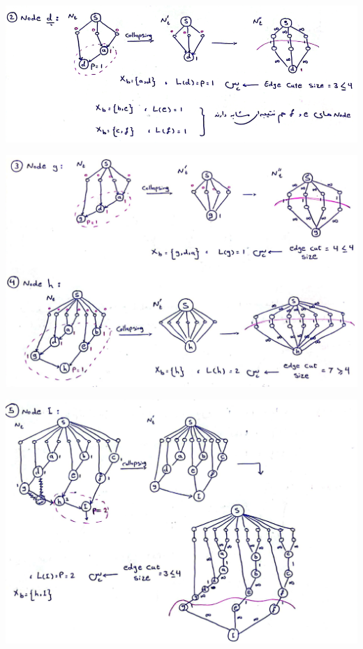 \begin{qsolve}
	\begin{center}
		\includegraphics*[width=0.8\linewidth]{pics/img7.png}
	\end{center}
	
	\begin{center}
		\includegraphics*[width=0.8\linewidth]{pics/img8.png}
	\end{center}
	
	\begin{center}
		\includegraphics*[width=0.8\linewidth]{pics/img9.png}
	\end{center}
\end{qsolve}
\newpage


